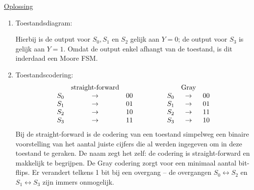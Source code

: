 \documentclass[kulak]{kulakarticle}
\begin{document}
	\underline{Oplossing}
	\begin{enumerate}
		\item Toestandsdiagram:
		\begin{figure}[h!]
			\centering
			
		\end{figure}

		Hierbij is de output voor \(S_0, S_1\) en \(S_2\) gelijk aan \(Y=0\); de output voor \(S_3\) is gelijk aan \(Y=1\). Omdat de output enkel afhangt van de toestand, is dit inderdaad een Moore FSM.

		\item Toestandscodering:
		\begin{align*}
			\begin{array}{c c c}
				& \text{straight-forward} &\\
				S_0 & \rightarrow & 00 \\
				S_1 & \rightarrow & 01 \\
				S_2 & \rightarrow & 10 \\
				S_3 & \rightarrow & 11 \\
			\end{array} \qquad \qquad \begin{array}{c c c}
			& \text{Gray} &\\
			S_0 & \rightarrow & 00 \\
			S_1 & \rightarrow & 01 \\
			S_2 & \rightarrow & 11 \\
			S_3 & \rightarrow & 10 \\
			\end{array}
		\end{align*}
		Bij de straight-forward is de codering van een toestand simpelweg een binaire voorstelling van het aantal juiste cijfers die al werden ingegeven om in deze toestand te geraken. De naam zegt het zelf: de codering is straight-forward en makkelijk te begrijpen. De Gray codering zorgt voor een minimaal aantal bit-flips. Er verandert telkens 1 bit bij een overgang -- de overgangen \(S_0 \leftrightarrow S_2\) en \(S_1 \leftrightarrow S_3\) zijn immers onmogelijk.
	\end{enumerate}
\end{document}
